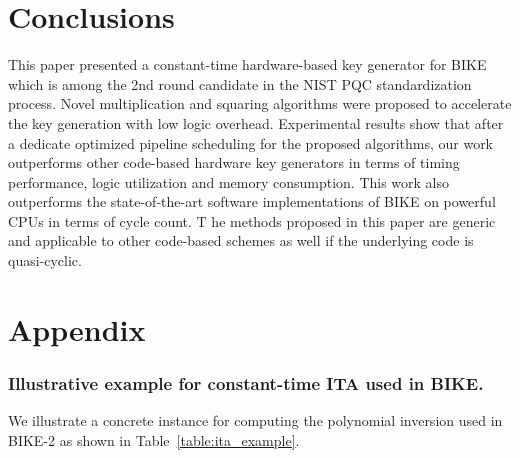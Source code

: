 \documentclass[runningheads]{llncs}
\begin{document}
 \section{Conclusions}
 \label{sec::conclusion}
 This paper presented a constant-time hardware-based key generator for BIKE which is among the
 2nd round candidate in the NIST PQC standardization process.
 Novel multiplication and squaring algorithms were proposed to accelerate the key generation with low logic overhead. Experimental results show that after a dedicate optimized pipeline scheduling for the proposed algorithms, our work outperforms other code-based hardware key generators in terms of timing performance, logic utilization and memory consumption. This work also outperforms the state-of-the-art software implementations of BIKE on powerful CPUs in terms of cycle count. T
 he methods proposed in this paper are generic and applicable to other code-based schemes as well if the underlying code is quasi-cyclic.

%
%
%
% 
% 
%



\newpage

\section*{Appendix}
%
\subsubsection{Illustrative example for constant-time ITA used in BIKE.}
%
We illustrate a concrete instance for computing the polynomial inversion used in BIKE-2 as shown in Table~\ref{table:ita_example}. 
\end{document}
